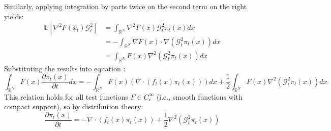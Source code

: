 \documentclass[a4paper,10pt]{article}
\theoremstyle{definition} %
\theoremstyle{definition} %
\theoremstyle{definition} %
\theoremstyle{definition} %
\newcommand{\0}{\boldsymbol{0}}
\begin{document}
Similarly, applying integration by parts twice on the second term on the right yields:
\begin{align*}
    \mathbb{E}[\nabla^2 F(x_t) \mathcal{G}_t^2] &= \int_{\mathbb{R}^N } \nabla^2 F(x) \mathcal{G}_t^2 \pi_t(x) dx \\
    &= -\int_{\mathbb{R}^N} \nabla F(x) \cdot \nabla(\mathcal{G}_t^2\pi_t(x)) dx \\
    &= \int_{\mathbb{R}^N} F(x) \nabla^2(\mathcal{G}_t^2 \pi_t(x)) dx
\end{align*}
Substituting the results into equation :
\[
\int_{\mathbb{R}^N}F(x)\frac{\partial\pi_t(x)}{\partial t} dx = - \int_{\mathbb{R}^N}F(x) (\nabla \cdot (f_t(x)\pi_t(x))) dx + \frac{1}{2}\int_{\mathbb{R}^N } F(x) \nabla^2(\mathcal{G}_t^2 \pi_t(x)) dx
\]
This relation holds for all test functions \( F \in C_c^{\infty} \) (i.e., smooth functions with compact support), so by distribution theory:
\[
\frac{\partial\pi_t(x)}{\partial t} = -\nabla \cdot (f_t(x)\pi_t(x)) + \frac{1}{2}\nabla^2(\mathcal{G}_t^2 \pi_t(x))
\]
\end{document}
